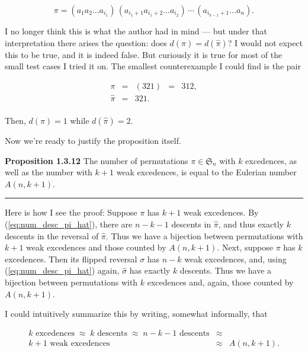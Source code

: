 \documentclass[]{article}
\begin{document}
\[\pi = (a_1 a_2 \ldots a_{i_1}) \,
        (a_{i_1+1} a_{i_1+2} \ldots a_{i_2}) \, \cdots \,
        (a_{i_{k-1}+1} \ldots a_n).\]

I no longer think this is what the author had in mind --- but under that
interpretation there arises the question: does \(d(\pi) = d(\hat\pi)\)?
I would not expect this to be true, and it is indeed false. But
curiously it is true for most of the small test cases I tried it on. The
smallest counterexample I could find is the pair

\[\begin{array}{rcccl}
    \pi & = & (321) & = & 312, \\
\hat\pi & = & 321. \\
\end{array}\]

Then, \(d(\pi) = 1\) while \(d(\hat\pi) = 2\).

Now we're ready to justify the proposition itself.

\textbf{Proposition 1.3.12} The number of permutations
\(\pi\in\mathfrak S_n\) with \(k\) excedences, as well as the number
with \(k+1\) weak excedences, is equal to the Eulerian number
\(A(n,k+1)\).

\begin{center}\rule{0.5\linewidth}{\linethickness}\end{center}

Here is how I see the proof: Suppose \(\pi\) has \(k + 1\) weak
excedences. By (\ref{eq:num_desc_pi_hat}), there are \(n - k - 1\)
descents in \(\hat\pi\), and thus exactly \(k\) descents in the reversal
of \(\hat\pi\). Thus we have a bijection between permutations with
\(k+1\) weak excedences and those counted by \(A(n,k+1)\). Next, suppose
\(\pi\) has \(k\) excedences. Then its flipped reversal \(\sigma\) has
\(n-k\) weak excedences, and, using (\ref{eq:num_desc_pi_hat}) again,
\(\hat\sigma\) has exactly \(k\) descents. Thus we have a bijection
between permutations with \(k\) excedences and, again, those counted by
\(A(n,k+1)\).

I could intuitively summarize this by writing, somewhat informally, that

\[\begin{array}{rcl}
  k     \text{ excedences}      \;\approx\;
  k     \text{ descents}        \;\approx\;
  n-k-1 \text{ descents}        & \approx & \\
  k+1   \text{ weak excedences} & \approx &
  A(n, k+1).\end{array}\]
\end{document}
